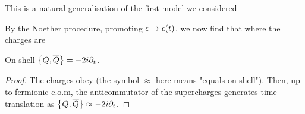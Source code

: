 \documentclass{article}
\begin{document}
\begin{remark}
This is a natural generalisation of the first model we considered 
\end{remark}
By the Noether procedure, promoting $\eps \to \eps(t)$, we now find that 
where the charges are 


\begin{lemma}
	On shell $\acomm[Q]{\bar{Q}} = -2i\del_t$. 
\end{lemma}
\begin{proof}
The charges obey
(the symbol $\approx$ here means "equals on-shell"). Then, up to fermionic e.o.m, the anticommutator of the supercharges generates time translation as $\acomm[Q]{\bar{Q}} \approx -2i \del_t$.
\end{proof}
\end{document}

